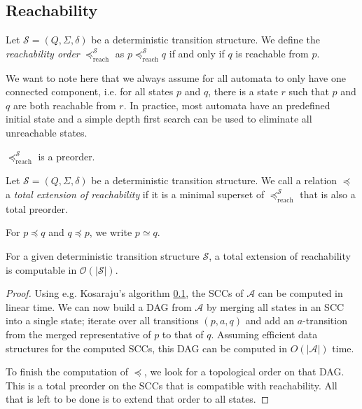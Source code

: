 \subsection{Reachability}

\begin{defn}
	Let $\mathcal{S} = (Q, \Sigma, \delta)$ be a deterministic transition structure. We define the \emph{reachability order} $\preceq_\text{reach}^\mathcal{S}$ as $p \preceq_\text{reach}^\mathcal{S} q$ if and only if $q$ is reachable from $p$. 
\end{defn}

We want to note here that we always assume for all automata to only have one connected component, i.e. for all states $p$ and $q$, there is a state $r$ such that $p$ and $q$ are both reachable from $r$. In practice, most automata have an predefined initial state and a simple depth first search can be used to eliminate all unreachable states.

\begin{lem}
	$\preceq_\text{reach}^\mathcal{S}$ is a preorder.
\end{lem}

\begin{defn}
	Let $\mathcal{S} = (Q, \Sigma, \delta)$ be a deterministic transition structure. We call a relation $\preceq$ a \emph{total extension of reachability} if it is a minimal superset of $\preceq_\text{reach}^\mathcal{S}$ that is also a total preorder.
	
	For $p \preceq q$ and $q \preceq p$, we write $p \simeq q$.
\end{defn}

\begin{lem}
	For a given deterministic transition structure $\mathcal{S}$, a total extension of reachability is computable in $\mathcal{O}(|\mathcal{S}|)$.
	\label{lem:general:reach_topo_lintime}
\end{lem}

\begin{proof}
	Using e.g. Kosaraju's algorithm \ref{}, the SCCs of $\mathcal{A}$ can be computed in linear time. We can now build a DAG from $\mathcal{A}$ by merging all states in an SCC into a single state; iterate over all transitions $(p, a, q)$ and add an $a$-transition from the merged representative of $p$ to that of $q$. Assuming efficient data structures for the computed SCCs, this DAG can be computed in $O(|\mathcal{A}|)$ time.
	
	To finish the computation of $\preceq$, we look for a topological order on that DAG. This is a total preorder on the SCCs that is compatible with reachability. All that is left to be done is to extend that order to all states.
\end{proof}

















